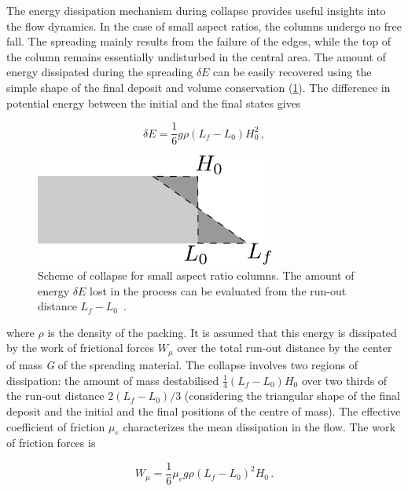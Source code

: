The energy dissipation mechanism during collapse provides useful insights 
into the flow dynamics. In the case of small aspect ratios, the columns undergo 
no free fall. The spreading mainly results from the failure of the edges, while 
the top of the column remains essentially undisturbed in the central area. 
The amount of energy dissipated during the 
spreading $\delta E$ can be easily recovered using the simple shape of the 
final deposit and volume conservation (\cref{fig:volume_conservation}). The 
difference in potential energy between the initial and the final states gives

\begin{equation}
\delta E = \frac{1}{6} g \rho (L_f - L_0) H_0^2 \,,
\end{equation}

\begin{figure}
\centering
\includegraphics[width=0.7\textwidth]{volume_conservation}
\caption[Scheme of collapse for small aspect ratio columns.]{Scheme of collapse 
for small aspect ratio columns. The amount of 
energy $\delta E$ lost in the process can be evaluated
from the run-out distance $L_f - L_0$~\citep{Staron2007a}.}
\label{fig:volume_conservation}
\end{figure}

where $\rho$ is the density of the packing. It is assumed that this energy is 
dissipated by the work of frictional forces $W_{\mu}$ over the total run-out 
distance by the center of mass \textit{G} of the spreading 
material. The collapse involves two regions of dissipation: the amount of mass 
destabilised $\frac{1}{4}(L_f - 
L_0) H_0$ over two thirds of the run-out distance $2(L_f - L_0) / 3$ 
(considering
the triangular shape of the final deposit and the initial and the final 
positions of the centre of mass). The effective coefficient of friction $\mu_e$ 
characterizes the mean dissipation in the flow. The work of friction forces is 

\begin{equation}
W_{\mu} = \frac{1}{6} \mu_e g \rho (L_f - L_0)^2 H_0 \,.
\end{equation}

